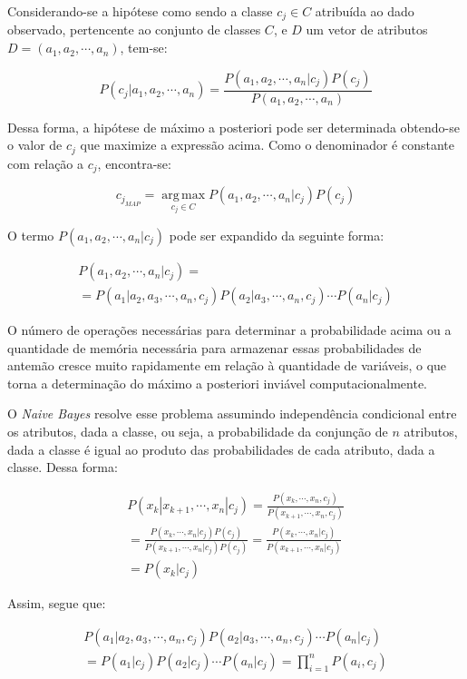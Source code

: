 \documentclass{article}
\begin{document}
Considerando-se a hipótese como sendo a classe $c_j \in C$
atribuída ao dado observado, pertencente ao conjunto de classes $C$, e $D$ um vetor de atributos $D = (a_1,a_2,\cdots,a_n)$, tem-se:

\begin{equation}
P(c_j|a_1,a_2,\cdots,a_n) = \frac{P(a_1,a_2,\cdots,a_n|c_j) P(c_j)}{P(a_1,a_2,\cdots,a_n)}
\end{equation}

Dessa forma, a hipótese de máximo a posteriori pode ser determinada obtendo-se o valor de $c_j$ que maximize a expressão acima.
Como o denominador é constante com relação a $c_j$, encontra-se:

\begin {equation}
c_{j_{MAP}} = \operatorname*{arg\,max}_{c_j \in C} P(a_1,a_2,\cdots,a_n|c_j) P(c_j)
\end {equation}

O termo $P(a_1,a_2,\cdots,a_n|c_j)$ pode ser expandido da seguinte forma:

\small
\begin {multline}
P(a_1,a_2,\cdots,a_n|c_j) = \\
= P(a_1|a_2,a_3,\cdots,a_n,c_j) P(a_2|a_3,\cdots,a_n,c_j) \cdots P(a_n|c_j)
\end{multline}
\normalsize

O número de operações necessárias para determinar a probabilidade acima ou a quantidade de memória necessária para armazenar essas probabilidades de antemão cresce muito rapidamente em relação à quantidade de variáveis,
o que torna a determinação do máximo a posteriori inviável computacionalmente.

O {\it Naive Bayes} resolve esse problema assumindo independência condicional entre os atributos,
dada a classe, ou seja, a probabilidade da conjunção de $n$ atributos,
dada a classe é igual ao produto das probabilidades de cada atributo, dada a classe. Dessa forma:

\begin{multline}
P(x_k|x_{k+1},\cdots,x_n|c_j) = \frac{P(x_k,\cdots,x_n,c_j)}{P(x_{k+1},\cdots,x_n,c_j)} \\
= \frac{P(x_k,\cdots,x_n|c_j) P(c_j)}{P(x_{k+1},\cdots,x_n|c_j) P(c_j)} = \frac{P(x_k,\cdots,x_n|c_j)}{P(x_{k+1},\cdots,x_n|c_j)} \\
= P(x_k|c_j)
\end{multline}

Assim, segue que:

\small
\begin{multline}
P(a_1|a_2,a_3,\cdots,a_n,c_j) P(a_2|a_3,\cdots,a_n,c_j) \cdots P(a_n|c_j) \\
= P(a_1|c_j) P(a_2|c_j) \cdots P(a_n|c_j) = \prod_{i=1}^n P(a_i,c_j)
\end{multline}
\normalsize
\end{document}
